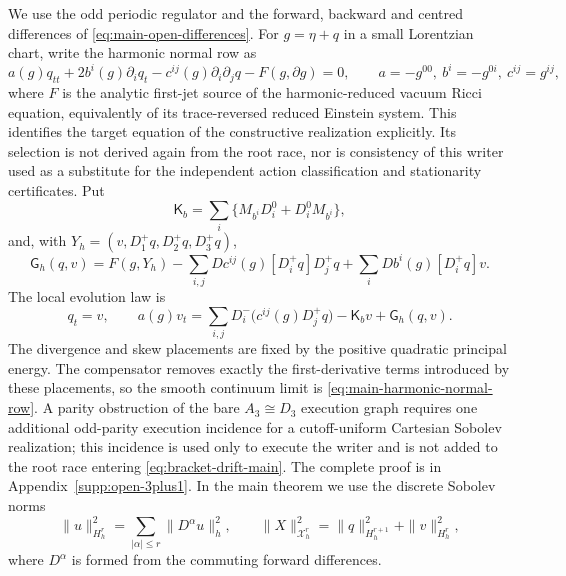 \documentclass[11pt]{article}
\numberwithin{equation}{section}
\theoremstyle{definition}
\theoremstyle{remark}
\begin{document}
We use the odd periodic regulator and the forward, backward and centred
differences of \eqref{eq:main-open-differences}.
For $g=\eta+q$ in a small Lorentzian chart, write the harmonic normal row as
\begin{equation}
 a(g)q_{tt}+2b^i(g)\partial_iq_t-c^{ij}(g)\partial_i\partial_jq
             -F(g,\partial g)=0,
 \qquad a=-g^{00},\ b^i=-g^{0i},\ c^{ij}=g^{ij},
 \label{eq:main-harmonic-normal-row}
\end{equation}
where $F$ is the analytic first-jet source of the harmonic-reduced vacuum
Ricci equation, equivalently of its trace-reversed reduced Einstein system. This identifies the target equation of the constructive
realization explicitly. Its selection is not derived again from the root
race, nor is consistency of this writer used as a substitute for the
independent action classification and stationarity certificates.  Put
\begin{equation}
 \mathsf K_b=\sum_i\{M_{b^i}D_i^0+D_i^0M_{b^i}\},
 \label{eq:main-open-skew-transport}
\end{equation}
and, with $Y_h=(v,D_1^+q,D_2^+q,D_3^+q)$,
\begin{equation}
 \mathsf G_h(q,v)=F(g,Y_h)
 -\sum_{i,j}Dc^{ij}(g)[D_i^+q]D_j^+q
 +\sum_iDb^i(g)[D_i^+q]v.
 \label{eq:main-open-compensator}
\end{equation}
The local evolution law is
\begin{equation}
 q_t=v,\qquad
 a(g)v_t=\sum_{i,j}D_i^-\!\bigl(c^{ij}(g)D_j^+q\bigr)
           -\mathsf K_bv+\mathsf G_h(q,v).
 \label{eq:main-open-writer}
\end{equation}
The divergence and skew placements are fixed by the positive quadratic
principal energy.  The compensator removes exactly the first-derivative terms
introduced by these placements, so the smooth continuum limit is
\eqref{eq:main-harmonic-normal-row}.  A parity obstruction of the bare
$A_3\cong D_3$ execution graph requires one additional odd-parity execution
incidence for a cutoff-uniform Cartesian Sobolev realization; this incidence
is used only to execute the writer and is not added to the root race entering
\eqref{eq:bracket-drift-main}.  The complete proof is in
Appendix~\ref{supp:open-3plus1}.  In the main theorem we use the discrete
Sobolev norms
\begin{equation}
 \|u\|_{H_h^r}^2=\sum_{|\alpha|\le r}\|D^\alpha u\|_h^2,
 \qquad
 \|X\|_{\mathcal X_h^r}^2=\|q\|_{H_h^{r+1}}^2+\|v\|_{H_h^r}^2,
 \label{eq:main-open-sobolev-norms}
\end{equation}
where $D^\alpha$ is formed from the commuting forward differences.
\end{document}
